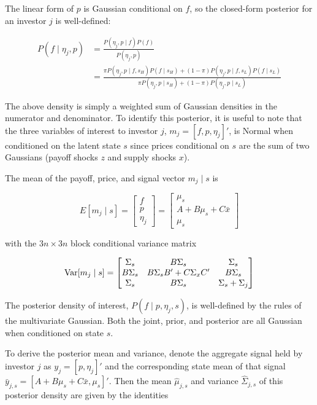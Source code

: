 \documentclass{article}
\begin{document}
The linear form of $p$ is Gaussian conditional on $f$, so the closed-form posterior for an investor $j$ is well-defined:

\begin{align*}
    P(f \mid \eta_j, p) &= \frac{P(\eta_j, p \mid f) P(f)}{P(\eta_j, p)} \\
    &= \frac{\pi P(\eta_j, p \mid f, s_H) P(f \mid s_H) + (1-\pi)P(\eta_j, p \mid f, s_L) P(f \mid s_L)}{
        \pi P(\eta_j, p \mid s_H) + (1-\pi) P(\eta_j, p \mid s_L)
    }
\end{align*}

\noindent The above density is simply a weighted sum of Gaussian densities in the numerator and denominator. To identify this posterior, it is useful to note that the three variables of interest to investor $j$, $m_j = [f, p, \eta_j]'$, is Normal when conditioned on the latent state $s$ since prices conditional on $s$ are the sum of two Gaussians (payoff shocks $z$ and supply shocks $x$). 

The mean of the payoff, price, and signal vector $m_j \mid s$ is

$$
E[m_j \mid s] = \begin{bmatrix}
    f \\ p \\ \eta_j
\end{bmatrix} =
\begin{bmatrix}
    \mu_s \\ A + B\mu_s + C \bar x \\ \mu_s
\end{bmatrix}
$$

\noindent with the $3n \times 3n$ block conditional variance matrix

$$
\text{Var}[m_j \mid s] = \begin{bmatrix}
    \Sigma_s & B \Sigma_s & \Sigma_s \\
    B \Sigma_s & B\Sigma_s B' + C \Sigma_x C' & B \Sigma_s \\
    \Sigma_s & B \Sigma_s & \Sigma_s + \Sigma_j
\end{bmatrix}
$$

The posterior density of interest, $P(f \mid p, \eta_j, s)$, is well-defined by the rules of the multivariate Gaussian. Both the joint, prior, and posterior are all Gaussian when conditioned on state $s$.

To derive the posterior mean and variance, denote the aggregate signal held by investor $j$ as $y_j = [p, \eta_j]'$ and the corresponding state mean of that signal $\bar y_{j,s} = [A + B \mu_s + C \bar x, \mu_s]'$. Then the mean $\hat \mu_{j,s}$ and variance $\hat \Sigma_{j,s}$ of this posterior density are given by the identities
\end{document}
